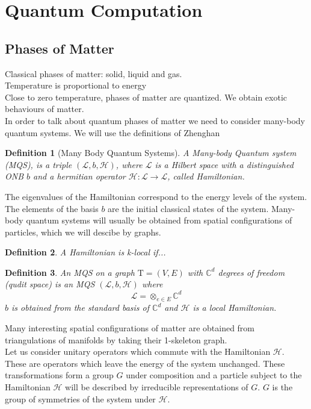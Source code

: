 \documentclass{article}
\newtheorem{definition}{Definition}
\newcommand{\Tau}{\mathrm{T}}
\begin{document}

\section{Quantum Computation}

\subsection{Phases of Matter}
Classical phases of matter: solid, liquid and gas.\\
Temperature is proportional to energy \\
Close to zero temperature, phases of matter are quantized. We obtain exotic behaviours of matter.\\
In order to talk about quantum phases of matter we need to consider many-body quantum systems. We will use the definitions of Zhenghan

\begin{definition}[Many Body Quantum Systems]
A Many-body Quantum system (MQS), is a triple $(\mathcal{L}, b, \mathcal{H})$, where $\mathcal{L}$ is a Hilbert space with a distinguished ONB $b$ and a hermitian operator $\mathcal{H}: \mathcal{L} \rightarrow \mathcal{L}$, called Hamiltonian.
\end{definition}
The eigenvalues of the Hamiltonian correspond to the energy levels of the system. The elements of the basis $b$ are the initial classical states of the system. Many-body quantum systems will usually be obtained from spatial configurations of particles, which we will descibe by graphs.
\begin{definition}
A Hamiltonian is k-local if...
\end{definition}

\begin{definition}
An MQS on a graph $\Tau = (V,E)$ with $\mathbb{C}^d$ degrees of freedom (qudit space) is an MQS $(\mathcal{L},b, \mathcal{H})$ where
$$ \mathcal{L} = \otimes_{e\in E} \mathbb{C}^d$$
$b$ is obtained from the standard basis of $\mathbb{C}^d$ and $\mathcal{H}$ is a local Hamiltonian.
\end{definition}
Many interesting spatial configurations of matter are obtained from triangulations of manifolds by taking their 1-skeleton graph.\\
Let us consider unitary operators which commute with the Hamiltonian $\mathcal{H}$. These are operators which leave the energy of the system unchanged. These transformations form a group $G$ under composition and a particle subject to the Hamiltonian $\mathcal{H}$ will be described by irreducible representations of $G$. $G$ is the group of symmetries of the system under $\mathcal{H}$.
\end{document}

